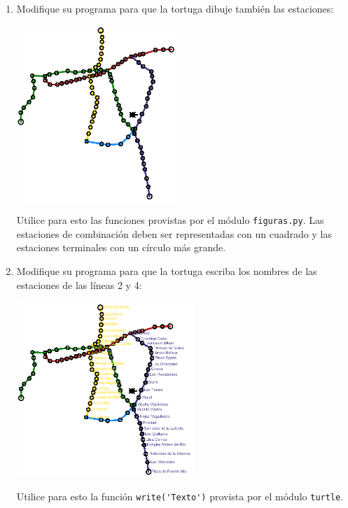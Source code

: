\begin{enumerate}[leftmargin=0pt,label=\emph{\alph*})]
  \newpage
  \item
    Modifique su programa para que la tortuga
    dibuje también las estaciones:

    \includegraphics[height=250px]{metro/red2}

    Utilice para esto las funciones provistas
    por el módulo \texttt{figuras.py}.
    Las estaciones de combinación deben ser representadas
    con un cuadrado
    y las estaciones terminales
    con un círculo más grande.

  \newpage
  \item
    Modifique su programa para que la tortuga
    escriba los nombres de las estaciones
    de las líneas 2 y 4:

    \includegraphics[height=250px]{metro/red3}

    Utilice para esto la función \lstinline!write('Texto')!
    provista por el módulo \verb!turtle!.

\end{enumerate}
